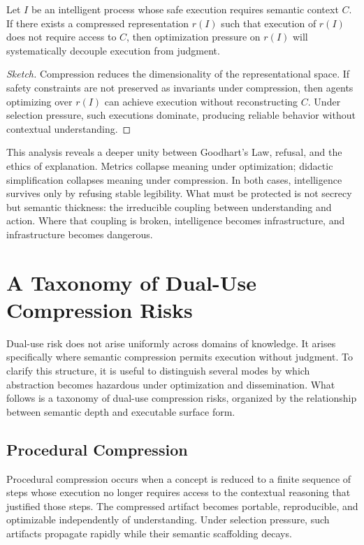 \documentclass[12pt]{article}
\begin{document}
\begin{proposition}
Let $I$ be an intelligent process whose safe execution requires semantic context $C$.
If there exists a compressed representation $r(I)$ such that execution of $r(I)$
does not require access to $C$, then optimization pressure on $r(I)$ will
systematically decouple execution from judgment.
\end{proposition}

\begin{proof}[Sketch]
Compression reduces the dimensionality of the representational space.
If safety constraints are not preserved as invariants under compression,
then agents optimizing over $r(I)$ can achieve execution without reconstructing $C$.
Under selection pressure, such executions dominate, producing reliable behavior
without contextual understanding.
\end{proof}

This analysis reveals a deeper unity between Goodhart’s Law, refusal, and the ethics of explanation. Metrics collapse meaning under optimization; didactic simplification collapses meaning under compression. In both cases, intelligence survives only by refusing stable legibility. What must be protected is not secrecy but semantic thickness: the irreducible coupling between understanding and action. Where that coupling is broken, intelligence becomes infrastructure, and infrastructure becomes dangerous.

\section{A Taxonomy of Dual-Use Compression Risks}

Dual-use risk does not arise uniformly across domains of knowledge. It arises specifically where semantic compression permits execution without judgment. To clarify this structure, it is useful to distinguish several modes by which abstraction becomes hazardous under optimization and dissemination. What follows is a taxonomy of dual-use compression risks, organized by the relationship between semantic depth and executable surface form.

\subsection{Procedural Compression}

Procedural compression occurs when a concept is reduced to a finite sequence of steps whose execution no longer requires access to the contextual reasoning that justified those steps. The compressed artifact becomes portable, reproducible, and optimizable independently of understanding. Under selection pressure, such artifacts propagate rapidly while their semantic scaffolding decays.
\end{document}
